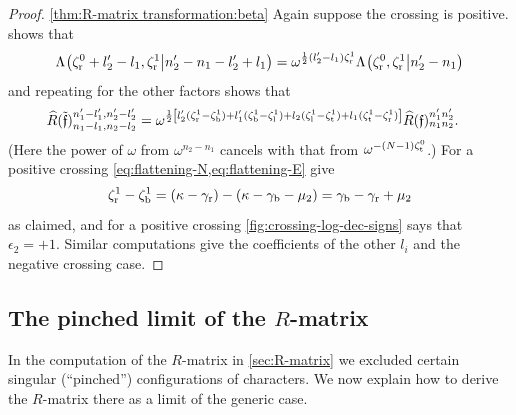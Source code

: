 \documentclass{sl2ams}
\numberwithin{equation}{section}
\begin{document}
\begin{proof}
  \ref{thm:R-matrix transformation:beta}
  Again suppose the crossing is positive.
   shows that
  \[
    \qlf{\zeta_{\lN}^0 + l_{2}' - l_{1}, \zeta_{\lN}^1}{n_2' - n_1 - l_{2}' + l_{1}}
    =
    \omega^{
      \frac{1}{2}
      (l_{2}' - l_{1}) \zeta_{\lN}^{1}
    }
    \qlf{\zeta_{\lN}^0, \zeta_{\lN}^1}{n_2' - n_1}
  \]
  and repeating for the other factors shows that
  \begin{align*}
    \rmat[\tilde{\mathfrak{f}}]{n_1 - l_{1},}{n_2 - l_{2}}{n_1' - l_{1}', }{n_2' - l_{2}'}
    &=
    \omega^{
      \frac{1}{2}
      \left[
      l_{2}'( \zeta_{\lN}^{1} - \zeta_{\lE}^{1} )
      +
      l_{1}'( \zeta_{\lE}^{1} - \zeta_{\lS}^{1} )
      +
      l_{2}( \zeta_{\lS}^{1} - \zeta_{\lW}^{1} )
      +
      l_{1}( \zeta_{\lW}^{1} - \zeta_{\lN}^{1} )
    \right]
    }
    \rmat[\mathfrak{f}]{n_1}{n_2}{n_1'}{n_2'}
    .
  \end{align*}
  (Here the power of \(\omega\) from \(\omega^{n_{2} - n_{1}}\) cancels with that from \(\omega^{-(N-1)\zeta_{\mathrm{t}}^{0}}\).)
  For a positive crossing \cref{eq:flattening-N,eq:flattening-E} give
  \[
    \zeta_{\mathrm{r}}^{1} - \zeta_{\mathrm{b}}^{1}
    =
    (\kappa - \gamma_{\mathrm{r}}) - ( \kappa - \gamma_{\mathrm{b}} - \mu_{2})
    =
    \gamma_{\mathrm{b}} - \gamma_{\mathrm{r}} + \mu_{2}
  \]
  as claimed, and for a positive crossing \cref{fig:crossing-log-dec-signs} says that \(\epsilon_{2} = +1\).
  Similar computations give the coefficients of the other \(l_i\) and the negative crossing case.
\end{proof}

\subsection{The pinched limit of the \texorpdfstring{\(R\)}{R}-matrix}
\label{sec:pinched-limit}

In the computation of the \(R\)-matrix in \cref{sec:R-matrix} we excluded certain singular (``pinched'') configurations of characters.
We now explain how to derive the \(R\)-matrix there as a limit of the generic case.
\end{document}

